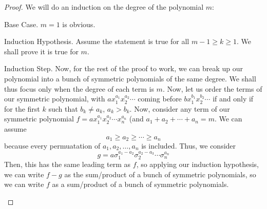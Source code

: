 \documentclass[11pt,titlepage]{scrartcl}
\begin{document}
\begin{proof}[Proof]
We will do an induction on the degree of the polynomial $m$:
\begin{induction_snippet}{Base Case.}
$m=1$ is obvious.
\end{induction_snippet}
\begin{induction_snippet}{Induction Hypothesis.}
Assume the statement is true for all $m-1\geq k\geq 1$. We shall prove it is true for $m$.
\end{induction_snippet}
\begin{induction_snippet}{Induction Step.}
Now, for the rest of the proof to work, we can break up our polynomial into a bunch of symmetric polynomials of the same degree. We shall thus focus only when the degree of each term is $m$. Now, let us order the terms of our symmetric polynomial, with $ax_1^{a_1}x_2^{a_2}\cdots$ coming before $bx_1^{b_1}x_2^{b_2}\cdots$ if and only if for the first $k$ such that $b_k\neq a_k$, $a_k>b_k$. Now, consider any term of our symmetric polynomial $f=ax_1^{a_1}x_2^{a_2}\cdots x_n^{a_n}$ (and $a_1+a_2+\cdots+a_n=m$. We can assume
\[a_1\geq a_2\geq\cdots\geq a_n\]
because every permuatation of $a_1,a_2,\ldots,a_n$ is included. Thus, we consider
\[g=a\sigma_1^{a_1-a_2}\sigma_2^{a_2-a_3}\cdots\sigma_n^{a_n}\]
Then, this has the same leading term as $f$, so applying our induction hypothesis, we can write $f-g$ as the sum/product of a bunch of symmetric polynomials, so we can write $f$ as a sum/product of a bunch of symmetric polynomials.
\end{induction_snippet}
\end{proof}
\end{document}
